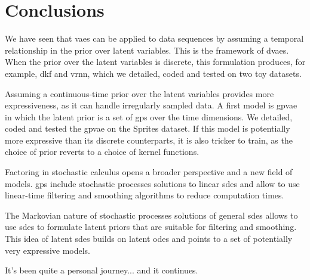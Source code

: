 \chapter{Conclusions}\label{sec:Conclusion}

We have seen that \glspl{vae} can be applied to data sequences by assuming a temporal relationship in the prior over latent variables. 
This is the framework of \glspl{dvae}. When the prior over the latent variables is discrete, this formulation produces, for example, 
\gls{dkf} and \gls{vrnn}, which we detailed, coded and tested on two toy datasets.

Assuming a continuous-time prior over the latent variables provides more expressiveness, as it can handle irregularly sampled data. 
A first model is \gls{gpvae} in which the latent prior is a set of \glspl{gp} over the time dimensions. We detailed, coded and tested 
the \gls{gpvae} on the Sprites dataset. If this model is potentially more expressive than its discrete counterparts, it is also 
tricker to train, as the choice of prior reverts to a choice of kernel functions.

Factoring in stochastic calculus opens a broader perspective and a new field of models. \glspl{gp} include stochastic processes 
solutions to linear \glspl{sde} and allow to use linear-time filtering and smoothing algorithms to reduce computation times. 

The Markovian nature of stochastic processes solutions of general \glspl{sde} allows to use \glspl{sde} to formulate latent priors 
that are suitable for filtering and smoothing. This idea of \glspl{latent sde} builds on \glspl{latent ode} and points to a 
set of potentially very expressive models.

It's been quite a personal journey... and it continues.